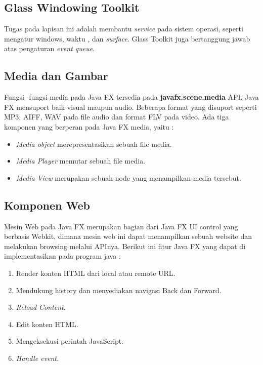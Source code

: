 \subsection{Glass Windowing Toolkit}
\label{subs:Glass_Windowing_Toolkit}
Tugas pada lapisan ini adalah membantu \textit{service} pada sistem operasi, seperti mengatur windows, waktu , dan \textit{surface}. Glass Toolkit juga bertanggung jawab atas pengaturan \textit{event queue}.\cite{javafx}

\subsection{Media dan Gambar}
\label{subs:Media_Gambar}
Fungsi -fungsi media pada Java FX tersedia pada \textbf{javafx.scene.media} API. Java FX mensuport baik visual maupun audio. Beberapa format yang disuport seperti MP3, AIFF, WAV pada file audio dan format FLV pada video. Ada tiga komponen yang berperan pada Java FX media, yaitu :\cite{javafx} 
\begin{itemize}
	\item \textit{Media object} merepresentasikan sebuah file media.
	\item \textit{Media Player} memutar sebuah file media.
	\item \textit{Media View} merupakan sebuah node yang menampilkan media tersebut.
\end{itemize}

\subsection{Komponen Web}
\label{subs:Komponen_Web}
Mesin Web pada Java FX merupakan bagian dari Java FX UI control yang berbasis Webkit, dimana mesin web ini dapat menampilkan sebuah website dan melakukan browsing melalui APInya. Berikut ini fitur Java FX yang dapat di implementasikan pada program java :\cite{javafx}
\begin{enumerate}
	\item Render konten HTML dari local atau remote URL.
	\item Mendukung history dan menyediakan navigasi Back dan Forward.
	\item \textit{Reload Content}.
	\item Edit konten HTML.
	\item Mengeksekusi perintah JavaScript.
	\item \textit{Handle event}.
\end{enumerate} 

